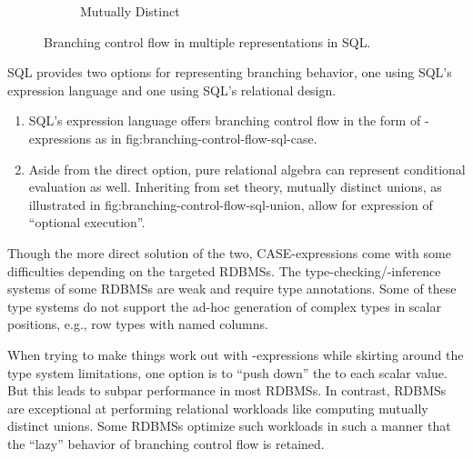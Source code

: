 \documentclass[sigconf,nonacm,screen,review,balance=false]{acmart}
\begin{document}
\begin{figure}[t]
\begin{subfigure}{0.24\textwidth}
    \caption{ Mutually Distinct }
    \label{fig:branching-control-flow-sql-union}
  \end{subfigure}
  \caption{{\color{branching}Branching} control flow in multiple representations in SQL.}
  \label{fig:branching-control-flow-sql}
\end{figure}

SQL provides two options for representing branching behavior, one using SQL's
expression language and one using SQL's relational design.

\begin{enumerate}
  \item[\cfoption{branching}{1}] SQL's expression language offers branching
   control flow in the form of -expressions as in \Cref
   {fig:branching-control-flow-sql-case}.

  \item[\cfoption{branching}{2}] Aside from the direct option, pure relational
   algebra can represent conditional evaluation as well. Inheriting from set
   theory, mutually distinct unions, as illustrated in \Cref
   {fig:branching-control-flow-sql-union}, allow for expression of ``optional
   execution''.
\end{enumerate}

Though the more direct solution of the two,  \keyword
{CASE}-expressions come with some difficulties depending on the targeted
RDBMSs. The type-checking/-inference systems of some RDBMSs are weak and
require type annotations. Some of these type systems do not support the ad-hoc
generation of complex types in scalar positions, e.g., row types with named
columns.

When trying to make things work out with -expressions while
skirting around the type system limitations, one option is to ``push down''
the  to each scalar value. But this leads to subpar performance
in most RDBMSs. In contrast, RDBMSs are exceptional at performing relational
workloads like computing  mutually distinct unions. Some
RDBMSs optimize such workloads in such a manner that the ``lazy'' behavior of
branching control flow is retained.
\end{document}
